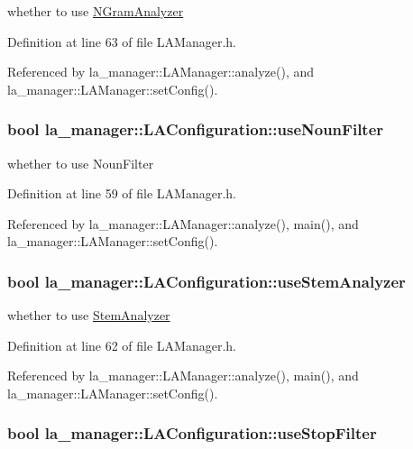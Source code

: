 whether to use \hyperlink{classla__manager_1_1NGramAnalyzer}{NGramAnalyzer} 



Definition at line 63 of file LAManager.h.

Referenced by la\_\-manager::LAManager::analyze(), and la\_\-manager::LAManager::setConfig().\hypertarget{classla__manager_1_1LAConfiguration_9cca2d25b40c0104d0271a2a1403dcb7}{
\subsubsection[{useNounFilter}]{\setlength{\rightskip}{0pt plus 5cm}bool {\bf la\_\-manager::LAConfiguration::useNounFilter}}}
\label{classla__manager_1_1LAConfiguration_9cca2d25b40c0104d0271a2a1403dcb7}


whether to use NounFilter 



Definition at line 59 of file LAManager.h.

Referenced by la\_\-manager::LAManager::analyze(), main(), and la\_\-manager::LAManager::setConfig().\hypertarget{classla__manager_1_1LAConfiguration_931c1acb6d3c09c43fabc8c40cc40c7e}{
\subsubsection[{useStemAnalyzer}]{\setlength{\rightskip}{0pt plus 5cm}bool {\bf la\_\-manager::LAConfiguration::useStemAnalyzer}}}
\label{classla__manager_1_1LAConfiguration_931c1acb6d3c09c43fabc8c40cc40c7e}


whether to use \hyperlink{classla__manager_1_1StemAnalyzer}{StemAnalyzer} 



Definition at line 62 of file LAManager.h.

Referenced by la\_\-manager::LAManager::analyze(), main(), and la\_\-manager::LAManager::setConfig().\hypertarget{classla__manager_1_1LAConfiguration_0e7754360be451943a8bdb250205a203}{
\subsubsection[{useStopFilter}]{\setlength{\rightskip}{0pt plus 5cm}bool {\bf la\_\-manager::LAConfiguration::useStopFilter}}}
\label{classla__manager_1_1LAConfiguration_0e7754360be451943a8bdb250205a203}


